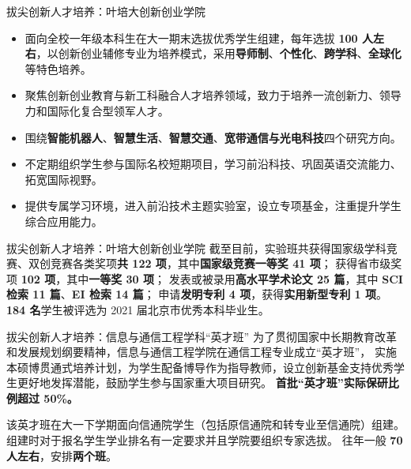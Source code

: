 \documentclass[aspectratio=169, utf8]{beamer}
\begin{document}
\begin{frame}{拔尖创新人才培养：叶培大创新创业学院}
    \begin{itemize}
        \item 面向全校一年级本科生在大一期末选拔优秀学生组建，每年选拔 \textcolor{Fore}{\textbf{100 人左右}}，以创新创业辅修专业为培养模式，采用\textcolor{Fore}{\textbf{导师制}}、\textcolor{Fore}{\textbf{个性化}}、\textcolor{Fore}{\textbf{跨学科}}、\textcolor{Fore}{\textbf{全球化}}等特色培养。
        \item 聚焦创新创业教育与新工科融合人才培养领域，致力于培养一流创新力、领导力和国际化复合型领军人才。
        \item 围绕\textcolor{Fore}{\textbf{智能机器人}}、\textcolor{Fore}{\textbf{智慧生活}}、\textcolor{Fore}{\textbf{智慧交通}}、\textcolor{Fore}{\textbf{宽带通信与光电科技}}四个研究方向。
        \item 不定期组织学生参与国际名校短期项目，学习前沿科技、巩固英语交流能力、拓宽国际视野。
        \item 提供专属学习环境，进入前沿技术主题实验室，设立专项基金，注重提升学生综合应用能力。
    \end{itemize}
\end{frame}

\begin{frame}{拔尖创新人才培养：叶培大创新创业学院}
    截至目前，实验班共获得国家级学科竞赛、双创竞赛各类奖项\textcolor{Fore}{\textbf{共 122 项}}，其中\textcolor{Fore}{\textbf{国家级竞赛一等奖 41 项}}；
    获得省市级奖项 \textcolor{Fore}{\textbf{102 项}}，其中\textcolor{Fore}{\textbf{一等奖 30 项}}；
    发表或被录用\textcolor{Fore}{\textbf{高水平学术论文 25 篇}}，其中 \textcolor{Fore}{\textbf{SCI 检索 11 篇}}、\textcolor{Fore}{\textbf{EI 检索 14 篇}}；
    申请\textcolor{Fore}{\textbf{发明专利 4 项}}，获得\textcolor{Fore}{\textbf{实用新型专利 1 项}}。
    \textcolor{Fore}{\textbf{184 名}}学生被评选为 2021 届北京市优秀本科毕业生。
\end{frame}

\begin{frame}{拔尖创新人才培养：信息与通信工程学科“英才班”}
    为了贯彻国家中长期教育改革和发展规划纲要精神，信息与通信工程学院在通信工程专业成立“英才班”，
    实施本硕博贯通式培养计划，为学生配备博导作为指导教师，设立创新基金支持优秀学生更好地发挥潜能，鼓励学生参与国家重大项目研究。
    \textcolor{Fore}{\textbf{首批“英才班”实际保研比例超过 50\%。}}

    该英才班在大一下学期面向信通院学生（包括原信通院和转专业至信通院）组建。
    组建时对于报名学生学业排名有一定要求并且学院要组织专家选拔。
    往年一般 \textcolor{Fore}{\textbf{70 人左右}}，安排\textcolor{Fore}{\textbf{两个班}}。
\end{frame}
\end{document}

